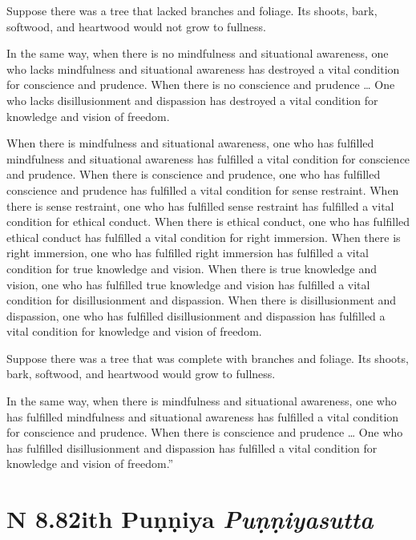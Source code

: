 \documentclass[12pt,openany]{book}%
\newcommand*{\suttatitleacronym}[1]{\smaller[2]{#1}\vspace*{.3em}}
\newcommand*{\suttatitletranslation}[1]{\linebreak{#1}}
\newcommand*{\suttatitleroot}[1]{\linebreak\smaller[2]\itshape{#1}}
\newcommand*{\tocacronym}[1]{\hspace*{-3.3em}{#1}\quad}
\newcommand*{\toctranslation}[1]{#1}
\newcommand*{\tocroot}[1]{(\textit{#1})}
\begin{document}
Suppose there was a tree that lacked branches and foliage. Its shoots, bark, softwood, and heartwood would not grow to fullness. 

In the same way, when there is no mindfulness and situational awareness, one who lacks mindfulness and situational awareness has destroyed a vital condition for conscience and prudence. When there is no conscience and prudence … One who lacks disillusionment and dispassion has destroyed a vital condition for knowledge and vision of freedom. 

When there is mindfulness and situational awareness, one who has fulfilled mindfulness and situational awareness has fulfilled a vital condition for conscience and prudence. When there is conscience and prudence, one who has fulfilled conscience and prudence has fulfilled a vital condition for sense restraint. When there is sense restraint, one who has fulfilled sense restraint has fulfilled a vital condition for ethical conduct. When there is ethical conduct, one who has fulfilled ethical conduct has fulfilled a vital condition for right immersion. When there is right immersion, one who has fulfilled right immersion has fulfilled a vital condition for true knowledge and vision. When there is true knowledge and vision, one who has fulfilled true knowledge and vision has fulfilled a vital condition for disillusionment and dispassion. When there is disillusionment and dispassion, one who has fulfilled disillusionment and dispassion has fulfilled a vital condition for knowledge and vision of freedom. 

Suppose there was a tree that was complete with branches and foliage. Its shoots, bark, softwood, and heartwood would grow to fullness. 

In the same way, when there is mindfulness and situational awareness, one who has fulfilled mindfulness and situational awareness has fulfilled a vital condition for conscience and prudence. When there is conscience and prudence … One who has fulfilled disillusionment and dispassion has fulfilled a vital condition for knowledge and vision of freedom.” 

%
\section*{{\suttatitleacronym AN 8.82}{\suttatitletranslation With Puṇṇiya }{\suttatitleroot Puṇṇiyasutta}}
\addcontentsline{toc}{section}{\tocacronym{AN 8.82} \toctranslation{With Puṇṇiya } \tocroot{Puṇṇiyasutta}}
\end{document}
